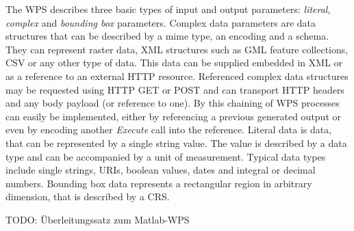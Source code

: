 	The \ac{WPS} describes three basic types of input and output parameters: \emph{literal}, \emph{complex} and \emph{bounding box} parameters. Complex data parameters are data structures that can be described by a mime type, an encoding and a schema. They can represent raster data, XML structures such as GML feature collections, CSV or any other type of data. This data can be supplied embedded in XML or as a reference to an external HTTP resource. Referenced complex data structures may be requested using HTTP GET or POST and can transport HTTP headers and any body payload (or reference to one). By this chaining of \ac{WPS} processes can easily be implemented, either by referencing a previous generated output or even by encoding another \emph{Execute} call into the reference. Literal data is data, that can be represented by a single string value. The value is described by a data type and can be accompanied by a unit of measurement. Typical data types include single strings, URIs, boolean values, dates and integral or decimal numbers. Bounding box data represents a rectangular region in arbitrary dimension, that is described by a \ac{CRS}.

	TODO: Überleitungssatz zum Matlab-WPS
